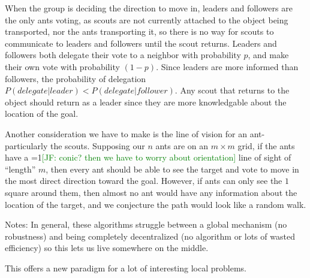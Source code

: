 \documentclass[12pt]{article}
\newcommand{\Comments}{1}
\newcommand{\mynote}[2]{\ifnum\Comments=1\textcolor{#1}{#2}\fi}
\newcommand{\jessie}[1]{\mynote{green}{[JF: #1]}}
\begin{document}
When the group is deciding the direction to move in, leaders and followers are the only ants voting, as scouts are not currently attached to the object being transported, nor the ants transporting it, so there is no way for scouts to communicate to leaders and followers until the scout returns.
Leaders and followers both delegate their vote to a neighbor with probability $p$, and make their own vote with probability $(1-p)$.
Since leaders are more informed than followers, the probability of delegation $P(delegate|leader) < P(delegate|follower)$.
Any scout that returns to the object should return as a leader since they are more knowledgable about the location of the goal.

Another consideration we have to make is the line of vision for an ant- particularly the scouts.
Supposing our $n$ ants are on an $m \times m$ grid, if the ants have a \jessie{conic? then we have to worry about orientation} line of sight of ``length'' $m$, then every ant should be able to see the target and vote to move in the most direct direction toward the goal.
However, if ants can only see the $1$ square around them, then almost no ant would have any information about the location of the target, and we conjecture the path would look like a random walk.


Notes:
In general, these algorithms struggle between a global mechanism (no robustness) and being completely decentralized (no algorithm or lots of wasted efficiency) so this lets us live somewhere on the middle.

This offers a new paradigm for a lot of interesting local problems. 


\end{document}
